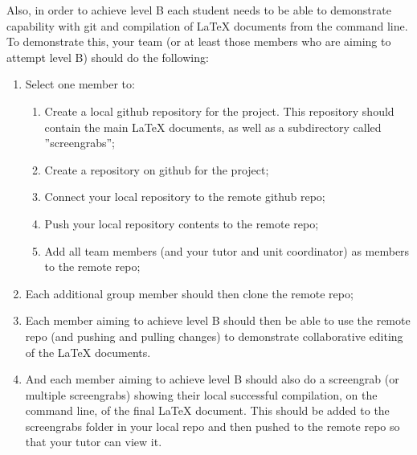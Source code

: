 \documentclass[a4paper, 11pt]{report}
\begin{document}
Also, in order to achieve level B each student needs to be able to demonstrate capability with git and compilation of LaTeX documents from the command line. To demonstrate this, your team (or at least those members who are aiming to attempt level B) should do the following:
\begin{enumerate}
	\item Select one member to:
	\begin{enumerate}
		\item Create a local github repository for the project. This repository should contain the main LaTeX documents, as well as a subdirectory called ''screengrabs'';
		\item Create a repository on github for the project;
		\item Connect your local repository to the remote github repo;
		\item Push your local repository contents to the remote repo;
		\item Add all team members (and your tutor and unit coordinator) as members to the remote repo;
	\end{enumerate}
	\item Each additional group member should then clone the remote repo;
	\item Each member aiming to achieve level B should then be able to use the remote repo (and pushing and pulling changes) to demonstrate collaborative editing of the LaTeX documents.
	\item And each member aiming to achieve level B should also do a screengrab (or multiple screengrabs) showing their local successful compilation, on the command line, of the final LaTeX document. This should be added to the screengrabs folder in your local repo and then pushed to the remote repo so that your tutor can view it.
\end{enumerate}
\end{document}
